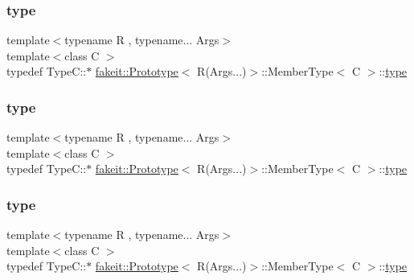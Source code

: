 \subsubsection{\texorpdfstring{type}{type}\hspace{0.1cm}{\footnotesize\ttfamily [2/9]}}
{\footnotesize\ttfamily template$<$typename R , typename... Args$>$ \\
template$<$class C $>$ \\
typedef Type\+C\+::$\ast$ \mbox{\hyperlink{structfakeit_1_1Prototype}{fakeit\+::\+Prototype}}$<$ R(Args...)$>$\+::Member\+Type$<$ C $>$\+::\mbox{\hyperlink{structfakeit_1_1Prototype_3_01R_07Args_8_8_8_08_4_1_1MemberType_a83b41bd489e085916700f036470cc383}{type}}}

\mbox{\label{structfakeit_1_1Prototype_3_01R_07Args_8_8_8_08_4_1_1MemberType_a83b41bd489e085916700f036470cc383}} 
\subsubsection{\texorpdfstring{type}{type}\hspace{0.1cm}{\footnotesize\ttfamily [3/9]}}
{\footnotesize\ttfamily template$<$typename R , typename... Args$>$ \\
template$<$class C $>$ \\
typedef Type\+C\+::$\ast$ \mbox{\hyperlink{structfakeit_1_1Prototype}{fakeit\+::\+Prototype}}$<$ R(Args...)$>$\+::Member\+Type$<$ C $>$\+::\mbox{\hyperlink{structfakeit_1_1Prototype_3_01R_07Args_8_8_8_08_4_1_1MemberType_a83b41bd489e085916700f036470cc383}{type}}}

\mbox{\label{structfakeit_1_1Prototype_3_01R_07Args_8_8_8_08_4_1_1MemberType_a83b41bd489e085916700f036470cc383}} 
\subsubsection{\texorpdfstring{type}{type}\hspace{0.1cm}{\footnotesize\ttfamily [4/9]}}
{\footnotesize\ttfamily template$<$typename R , typename... Args$>$ \\
template$<$class C $>$ \\
typedef Type\+C\+::$\ast$ \mbox{\hyperlink{structfakeit_1_1Prototype}{fakeit\+::\+Prototype}}$<$ R(Args...)$>$\+::Member\+Type$<$ C $>$\+::\mbox{\hyperlink{structfakeit_1_1Prototype_3_01R_07Args_8_8_8_08_4_1_1MemberType_a83b41bd489e085916700f036470cc383}{type}}}


